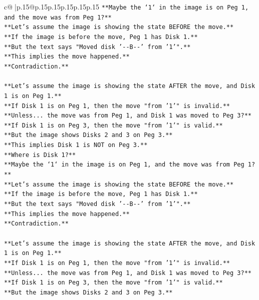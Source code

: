 \documentclass{article}
\begin{document}
{\begin{supertabular}{c@{$\;$}|p{.15\linewidth}@{}p{.15\linewidth}p{.15\linewidth}p{.15\linewidth}p{.15\linewidth}p{.15\linewidth}}
{{{\texttt{**Maybe the `1` in the image is on Peg 1, and the move was from Peg 1?**} \\
\texttt{**Let's assume the image is showing the state BEFORE the move.**} \\
\texttt{**If the image is before the move, Peg 1 has Disk 1.**} \\
\texttt{**But the text says "Moved disk '{-}{-}B{-}{-}' from '1'".**} \\
\texttt{**This implies the move happened.**} \\
\texttt{**Contradiction.**} \\
\\ 
\texttt{**Let's assume the image is showing the state AFTER the move, and Disk 1 is on Peg 1.**} \\
\texttt{**If Disk 1 is on Peg 1, then the move "from '1'" is invalid.**} \\
\texttt{**Unless... the move was from Peg 1, and Disk 1 was moved to Peg 3?**} \\
\texttt{**If Disk 1 is on Peg 3, then the move "from '1'" is valid.**} \\
\texttt{**But the image shows Disks 2 and 3 on Peg 3.**} \\
\texttt{**This implies Disk 1 is NOT on Peg 3.**} \\
\texttt{**Where is Disk 1?**} \\
\texttt{**Maybe the `1` in the image is on Peg 1, and the move was from Peg 1?**} \\
\texttt{**Let's assume the image is showing the state BEFORE the move.**} \\
\texttt{**If the image is before the move, Peg 1 has Disk 1.**} \\
\texttt{**But the text says "Moved disk '{-}{-}B{-}{-}' from '1'".**} \\
\texttt{**This implies the move happened.**} \\
\texttt{**Contradiction.**} \\
\\ 
\texttt{**Let's assume the image is showing the state AFTER the move, and Disk 1 is on Peg 1.**} \\
\texttt{**If Disk 1 is on Peg 1, then the move "from '1'" is invalid.**} \\
\texttt{**Unless... the move was from Peg 1, and Disk 1 was moved to Peg 3?**} \\
\texttt{**If Disk 1 is on Peg 3, then the move "from '1'" is valid.**} \\
\texttt{**But the image shows Disks 2 and 3 on Peg 3.**} \\
}}}
\end{supertabular}}
\end{document}
